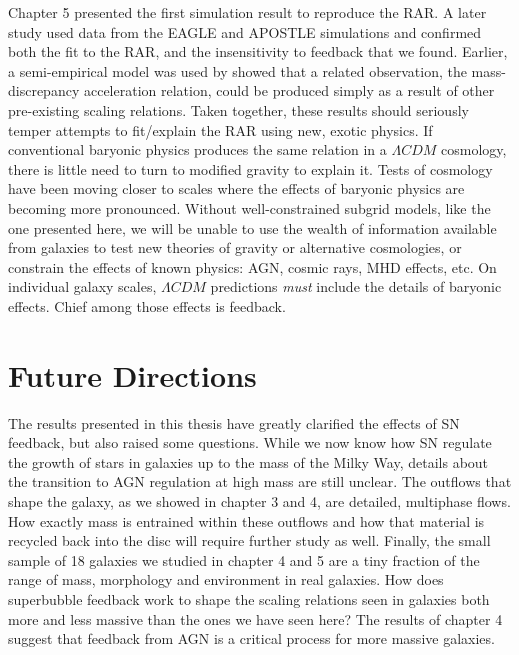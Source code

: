 Chapter 5 presented the first simulation result to reproduce the
\citet{McGaugh2016} RAR.  A later study \citep{Ludlow2016} used data from the
EAGLE \citep{Schaye2015} and APOSTLE \citep{Sawala2016} simulations and
confirmed both the fit to the RAR, and the insensitivity to feedback that we
found.  Earlier, a semi-empirical model was used by \citet{DiCintio2016} showed
that a related observation, the mass-discrepancy acceleration relation, could be
produced simply as a result of other pre-existing scaling relations.  Taken
together, these results should seriously temper attempts to fit/explain the RAR
using new, exotic physics.  If conventional baryonic physics produces the same
relation in a $\Lambda CDM$ cosmology, there is little need to turn to modified
gravity \citep{Moffat2016,Verlinde2016,Burrage2016} to explain it.  Tests of
cosmology have been moving closer to scales where the effects of baryonic
physics are becoming more pronounced.  Without well-constrained subgrid models,
like the one presented here, we will be unable to use the wealth of information
available from galaxies to test new theories of gravity or alternative
cosmologies, or constrain the effects of known physics: AGN, cosmic rays,
MHD effects, etc.  On individual galaxy scales, $\Lambda CDM$ predictions {\it must}
include the details of baryonic effects.  Chief among those effects is feedback.

\section{Future Directions}
The results presented in this thesis have greatly clarified the effects of SN
feedback, but also raised some questions.  While we now know how SN regulate the
growth of stars in galaxies up to the mass of the Milky Way, details about the
transition to AGN regulation at high mass are still unclear.  The outflows that
shape the galaxy, as we showed in chapter 3 and 4, are detailed, multiphase
flows.  How exactly mass is entrained within these outflows and how that
material is recycled back into the disc will require further study as well.
Finally, the small sample of 18 galaxies we studied in chapter 4 and 5 are a
tiny fraction of the range of mass, morphology and environment in real
galaxies.  How does superbubble feedback work to shape the scaling relations
seen in galaxies both more and less massive than the ones we have seen here?
The results of chapter 4 suggest that feedback from AGN is a critical process
for more massive galaxies.

